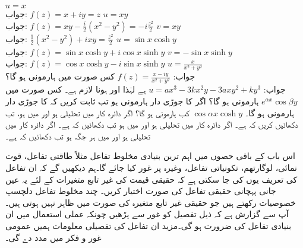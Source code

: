 \quad
$u=x$\\
جواب:\quad
$f(z)=x+iy=z$
\quad
$u=xy$\\
جواب:\quad
$f(z)=xy-\tfrac{i}{2}(x^2-y^2)=-i\frac{z^2}{2}$
\quad
$v=xy$\\
جواب:\quad
$\tfrac{1}{2}(x^2-y^2)+ixy=\tfrac{z^2}{2}$
\quad
$u=\sin x\cosh y$\\
جواب:\quad
$f(z)=\sin x\cosh y+i\cos x\sinh y$
\quad
$v=-\sin x\sinh y$\\
جواب:\quad
$f(z)=\cos x\cosh y-i\sin x\sinh y$
\quad
$u=\frac{x}{x^2+y^2}$\\
جواب:\quad
$f(z)=\frac{x-iy}{x^2+y^2}$
\quad
کس صورت میں   ہارمونی ہو گا؟\\
جواب:\quad
$u=ax^3-3kx^2y-3axy^2+ky^3$ 
ہے لہٰذا  اور  ہونا لازم ہے۔
\quad
کس صورت میں 
$e^{\alpha x}\cos \beta y$
 ہارمونی ہو گا؟
\quad
اگر  کا جوڑی دار ہارمونی  ہو تب ثابت کریں کہ  کا جوڑی دار ہارمونی  ہو گا۔
\quad
$\cos \alpha x\cosh y$
کب ہارمونی ہو گا؟
\quad
اگر دائرہ کار  میں  تحلیلی ہو اور  میں  ہو، تب دکھائیں کریں کہ  ہے۔
\quad
اگر دائرہ کار  میں  تحلیلی ہو اور  میں  ہو تب دکھائیں کہ  ہے۔
\quad
اگر دائرہ کار  میں  تحلیلی ہو اور  میں ہر جگہ  ہو تب دکھائیں کہ  ہے۔

اس  باب کے باقی حصوں میں اہم ترین بنیادی مخلوط تفاعل مثلاً طاقتی تفاعل، قوت نمائی، لوگارتھم، تکونیاتی تفاعل، وغیرہ پر غور کیا جائے گا۔ہم دیکھیں گے کہ ان تفاعل کی تعریف یوں کی جا سکتی ہے کہ حقیقی قیمت کی غیر تابع متغیرات کے لئے یہ عین جانی پہچانی حقیقی تفاعل کی صورت اختیار کریں۔ چند مخلوط تفاعل دلچسپ خصوصیات  رکھتے ہیں جو حقیقی غیر تابع متغیرہ کی صورت میں
  ظاہر نہیں ہوتی ہیں۔آپ سے گزارش ہے کہ ذیل تفصیل کو غور سے پڑھیں چونکہ عملی استعمال میں ان بنیادی تفاعل کی ضرورت ہو گی۔مزید ان تفاعل کی تفصیلی معلومات ہمیں عمومی غور و فکر میں مدد دے گی۔

